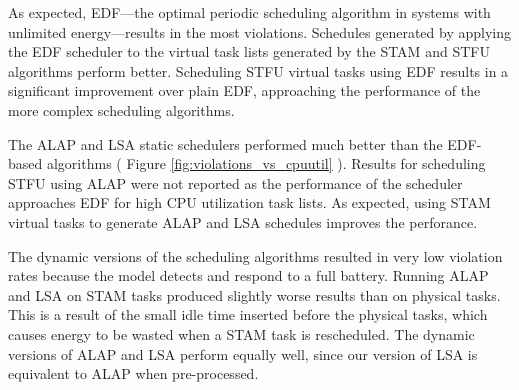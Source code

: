 
As expected, \textsc{EDF}---the optimal periodic scheduling algorithm in systems with unlimited energy---results in the most violations.  Schedules generated by applying the \textsc{EDF} scheduler to the virtual task lists generated by the \textsc{STAM} and \textsc{STFU} algorithms perform better.  Scheduling \textsc{STFU} virtual tasks using \textsc{EDF} results in a significant improvement over plain \textsc{EDF}, approaching the performance of the more complex scheduling algorithms.



The \textsc{ALAP} and \textsc{LSA} static schedulers performed much better than the \textsc{EDF}-based algorithms
( Figure \ref{fig:violations_vs_cpuutil} ).
Results for scheduling \textsc{STFU} using \textsc{ALAP} were not reported as the performance of the scheduler 
approaches \textsc{EDF} for high CPU utilization task lists.  
As expected, using \textsc{STAM} virtual tasks to generate \textsc{ALAP} and \textsc{LSA} schedules improves the perforance.  

The dynamic versions of the scheduling algorithms resulted in very low violation rates because the model detects 
and respond to a full battery.  Running \textsc{ALAP} and \textsc{LSA} on \textsc{STAM} tasks produced slightly worse 
results than on physical tasks.  This is a result of the small idle time inserted before the physical tasks, 
which causes energy to be wasted when a \textsc{STAM} task is rescheduled.
The dynamic versions of \textsc{ALAP} and \textsc{LSA} perform equally well, since our version of \textsc{LSA} is equivalent to \textsc{ALAP} when pre-processed. %

